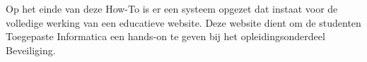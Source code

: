 Op het einde van deze How-To is er een systeem opgezet dat instaat voor de volledige werking van een educatieve website. Deze website dient om de studenten Toegepaste Informatica een hands-on te geven bij het opleidingsonderdeel Beveiliging.